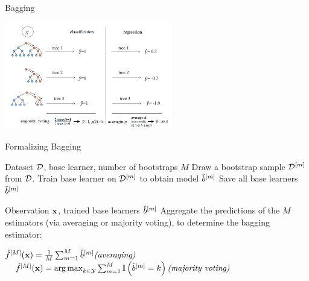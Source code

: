 \documentclass[11pt,compress,t,notes=noshow, xcolor=table]{beamer}
\begin{document}
\begin{vbframe}{Bagging}
\begin{center}
\includegraphics[width=0.55\textwidth]{figure_man/rf_majvot_averaging.png}
\end{center}
\end{vbframe}


\begin{vbframe}{Formalizing Bagging}

\begin{algorithm}[H]
  \footnotesize
  \caption*{Bagging algorithm: Training}
  \begin{algorithmic}[1]
     Dataset $\mathcal{D}$, base learner, number of bootstraps $M$
      \State Draw a bootstrap sample $\mathcal{D}^{[m]}$ from $\mathcal{D}$.
      \State Train base learner on $\mathcal{D}^{[m]}$ to obtain model $\hat{b}^{[m]}$
    \EndFor
    \State Save all base learners $\hat{b}^{[m]}$
  \end{algorithmic}
\end{algorithm}

\begin{algorithm}[H]
  \footnotesize
  \caption*{Bagging algorithm: Prediction}
  \begin{algorithmic}[1]
     Observation $\mathbf{x}$, trained base learners $\hat{b}^{[m]}$
    \State Aggregate the predictions of the $M$ estimators (via averaging or majority voting), to determine the bagging estimator:
    \begin{center}
    $\hat f^{[M]}(\mathbf{x}) = \frac{1}{M} \sum_{m=1}^M \hat{b}^{[m]} \textit{(averaging)}$
    $\quad \hat f^{[M]}(\mathbf{x}) = \operatorname*{arg\,max}_{k \in \mathcal{Y}} \sum_{m=1}^M \mathbb{I}\left(\hat{b}^{[m]} = k\right) \textit{(majority voting)}$
    \end{center}
  \end{algorithmic}
\end{algorithm}

\end{vbframe}
\end{document}
